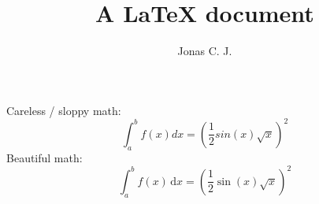 \documentclass[a4paper, 12pt]{article}
\title{A \LaTeX{} document}
\author{Jonas C. J.}
\begin{document}
\noindent Careless / sloppy math: 
\begin{equation}
	\int_a^b f(x)dx 
	= (\frac{1}{2}
	sin(x)\sqrt{x})^2
\end{equation}
Beautiful math:
\begin{equation}
	\int_a^b f(x) \, \mathrm{d} x
	= \left(\frac{1}{2}
	\sin(x)\sqrt{x}\right)^2
\end{equation}
\end{document}
